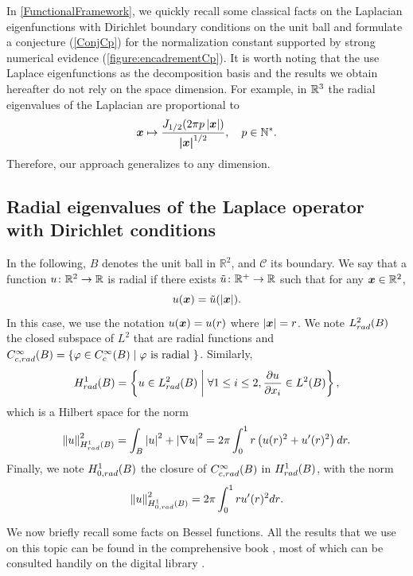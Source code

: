 \documentclass[smallextended]{svjour3}
\begin{document}
In \autoref{FunctionalFramework}, we quickly recall some classical facts on the Laplacian eigenfunctions with Dirichlet boundary conditions on the unit ball and formulate a conjecture (\autoref{ConjCp}) for the normalization constant supported by strong numerical evidence (\autoref{figure:encadrementCp}). It is worth noting that the use Laplace eigenfunctions as the decomposition basis and the results we obtain hereafter do not rely on the space dimension. For example, in $\mathbb{R}^3$ the radial eigenvalues of the Laplacian are proportional to
\[  \boldsymbol{x} \mapsto \dfrac{J_{1/2}(2\pi p\left\lvert \boldsymbol{x} \right\rvert)}{\boldsymbol{|x|}^{1/2}}, \quad  p\in\mathbb{N}^*.\] 
Therefore, our approach generalizes \cite{Alouges2015} to any dimension.  
\subsection{Radial eigenvalues of the Laplace operator with Dirichlet conditions}
\label{FunctionalFramework}
In the following, $B$ denotes the unit ball in $\mathbb{R}^2$, and $\mathcal{C}$ its boundary. We say that a function $u\colon\mathbb{R}^2\rightarrow \mathbb{R}$ is radial if there exists $\tilde{u}\colon\mathbb{R}^+\to \mathbb{R}$ such that for any $\boldsymbol{x} \in \mathbb{R}^2$, 
\[ u(\boldsymbol{x}) = \tilde{u}(\left\lvert \boldsymbol{x} \right\rvert).\] 
In this case, we use the notation $u(\boldsymbol{x})= u(r)$ where $\left\lvert \boldsymbol{x} \right\rvert = r$. 
We note $L^2_{rad}(B)$ the closed subspace of $L^2$ that are radial functions and $C^\infty_{c,rad}(B) = \left\{\varphi \in C^{\infty}_c(B)\mathrel{}\middle|\mathrel{}\varphi \text{ is radial }\right\}$. Similarly,
\[H^1_{rad}(B) = \left\{ u \in L^2_{rad}(B)\mathrel{}\middle|\mathrel{} \forall 1 \leq i \leq 2, \dfrac{\partial u}{\partial x_i} \in L^2(B)\right\},\]
which is a Hilbert space for the norm
\[\left\|u\right\|_{H^1_{rad}(B)}^2 = \int_{B}\left\lvert u \right\rvert^2 + \left\lvert \nabla u \right\rvert^2 = 2\pi\int_{0}^1 r \left(u(r)^2 + u'(r)^2\right) dr. \]
Finally, we note $H^1_{0,rad}(B)$ the closure of $C^\infty_{c,rad}(B)$ in $H^1_{rad}(B)$, with the norm
\[\left\|u\right\|_{H^1_{0,rad}(B)}^2 = {2\pi \int_{0}^1 r u'(r)^2dr}.\] 

We now briefly recall some facts on Bessel functions. All the results that we use on this topic can be found in the comprehensive book \cite{abramowitz1964handbook}, most of which can be consulted handily on the digital library \cite{NIST:DLMF}.
\end{document}
